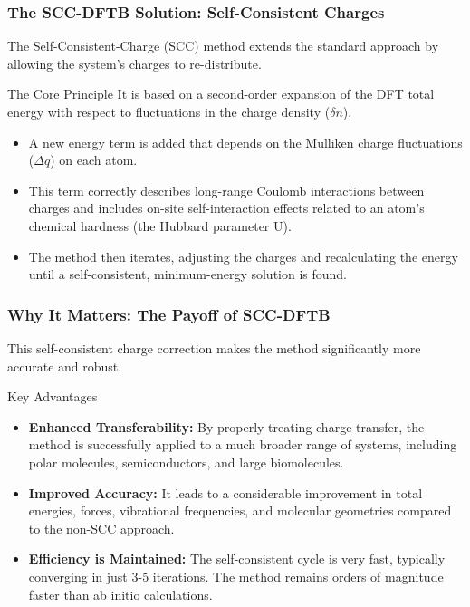 \begin{frame}
  \frametitle{The SCC-DFTB Solution: Self-Consistent Charges}
  
  The Self-Consistent-Charge (SCC) method extends the standard approach by allowing the system's charges to re-distribute. \pause
  
  \begin{block}{The Core Principle}
    It is based on a second-order expansion of the DFT total energy with respect to fluctuations in the charge density ($\delta n$).
  \end{block} \pause
  
  \begin{itemize}
    \item A new energy term is added that depends on the Mulliken charge fluctuations ($\Delta q$) on each atom. \pause
    
    \item This term correctly describes long-range Coulomb interactions between charges and includes on-site self-interaction effects related to an atom's chemical hardness (the Hubbard parameter U). \pause
    
    \item The method then iterates, adjusting the charges and recalculating the energy until a self-consistent, minimum-energy solution is found.
  \end{itemize}
\end{frame}

\begin{frame}
  \frametitle{Why It Matters: The Payoff of SCC-DFTB}
  
  This self-consistent charge correction makes the method significantly more accurate and robust. \pause
  
  \begin{alertblock}{Key Advantages}
    \begin{itemize}
      \item \textbf{Enhanced Transferability:} By properly treating charge transfer, the method is successfully applied to a much broader range of systems, including polar molecules, semiconductors, and large biomolecules. \pause
      
      \item \textbf{Improved Accuracy:} It leads to a considerable improvement in total energies, forces, vibrational frequencies, and molecular geometries compared to the non-SCC approach. \pause
      
      \item \textbf{Efficiency is Maintained:} The self-consistent cycle is very fast, typically converging in just 3-5 iterations. The method remains orders of magnitude faster than ab initio calculations.
    \end{itemize}
  \end{alertblock}
  
\end{frame}

